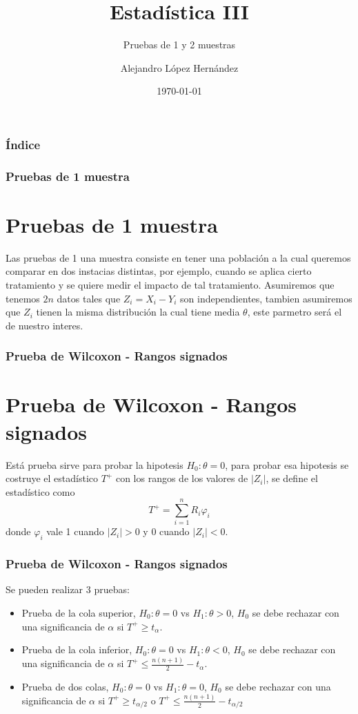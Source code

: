 \documentclass[aspectratio=169,spanish]{beamer}
\title{Estadística III}
\subtitle{Pruebas de 1 y 2 muestras}
\author{Alejandro López Hernández}
\institute{FES Acatlán - UNAM}
\date{\today}
\begin{document}
\frame{\titlepage}
\begin{frame}
\frametitle{Índice}
\tableofcontents
\end{frame}

\begin{frame}
\frametitle{Pruebas de 1 muestra}
\section{Pruebas de 1 muestra}
Las pruebas de 1 una muestra consiste en tener una población a la cual queremos comparar en dos instacias distintas, por ejemplo, cuando se aplica cierto tratamiento y se quiere medir el impacto de tal tratamiento. Asumiremos que tenemos $2n$ datos tales que $Z_i=X_i-Y_i$ son independientes, tambien asumiremos que $Z_i$ tienen la misma distribución la cual tiene media $\theta$, este parmetro será el de nuestro interes. 
\end{frame}


\begin{frame}
\frametitle{Prueba de Wilcoxon - Rangos signados}
\section{Prueba de Wilcoxon - Rangos signados}
Está prueba sirve para probar la hipotesis $H_0:\theta =0$, para probar esa hipotesis se costruye el estadístico $T^{+}$ con los rangos de los valores de $|Z_i|$, se define el estadístico como $$ T^{+}=\sum_{i=1}^{n}R_i\varphi_i$$
donde $\varphi_i$ vale 1 cuando $|Z_i|>0$ y 0 cuando $|Z_i|<0$.
\end{frame}
\begin{frame}
\frametitle{Prueba de Wilcoxon - Rangos signados}
Se pueden realizar 3 pruebas:
\begin{itemize}
\item Prueba de la cola superior, $H_0:\theta=0$ vs $H_1:\theta>0$, $H_0$ se debe rechazar con una significancia de $\alpha$ si $T^{+}\ge t_\alpha$.
\item Prueba de la cola inferior, $H_0:\theta=0$ vs $H_1:\theta<0$, $H_0$ se debe rechazar con una significancia de $\alpha$ si $T^{+}\le \frac{n(n+1)}{2} -t_\alpha$.
\item Prueba de dos colas, $H_0:\theta=0$ vs $H_1:\theta=0$, $H_0$ se debe rechazar con una significancia de $\alpha$ si $T^{+}\ge t_{\alpha/2}$ o $T^{+}\le \frac{n(n+1)}{2} -t_{\alpha/2}$
\end{itemize}
\end{frame}
\end{document}
